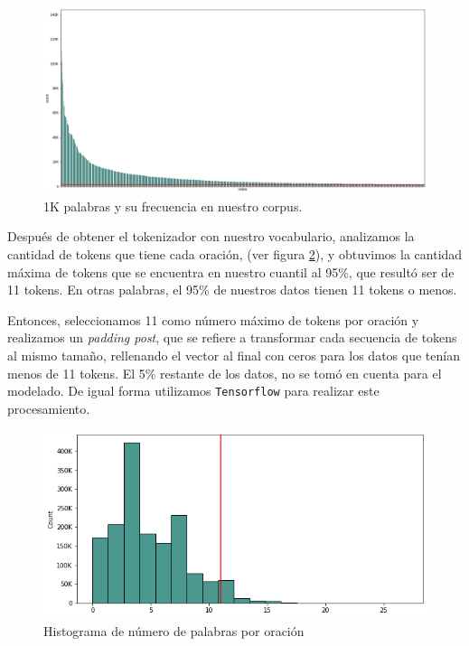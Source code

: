 \documentclass[sigconf, nonacm, spanish]{acmart}
\begin{document}
\begin{figure}
  \centering
  \includegraphics[width=\linewidth]{figures/1000vocabulario}
  \caption{1K palabras y su frecuencia en nuestro corpus.}
  \label{fig:vocabulario}
\end{figure}

Después de obtener el tokenizador con nuestro vocabulario, analizamos la cantidad de tokens que tiene cada oración, (ver figura \ref{fig:histogram}), y obtuvimos la cantidad máxima de tokens que se encuentra en nuestro cuantil al 95\%, que resultó ser de 11 tokens. En otras palabras, el 95\% de nuestros datos tienen 11 tokens o menos. 

Entonces, seleccionamos 11 como número máximo de tokens por oración y realizamos un \textit{padding post}, que se refiere a transformar cada secuencia de tokens al mismo tamaño, rellenando el vector al final con ceros para los datos que tenían menos de 11 tokens. El 5\% restante de los datos, no se tomó en cuenta para el modelado. De igual forma utilizamos \texttt{Tensorflow} \cite{tersopreprocessing} para realizar este procesamiento.

\begin{figure}
  \centering
  \includegraphics[width=\linewidth]{figures/histogram}
  \caption{Histograma de número de palabras por oración}
  \label{fig:histogram}
\end{figure}
\end{document}
